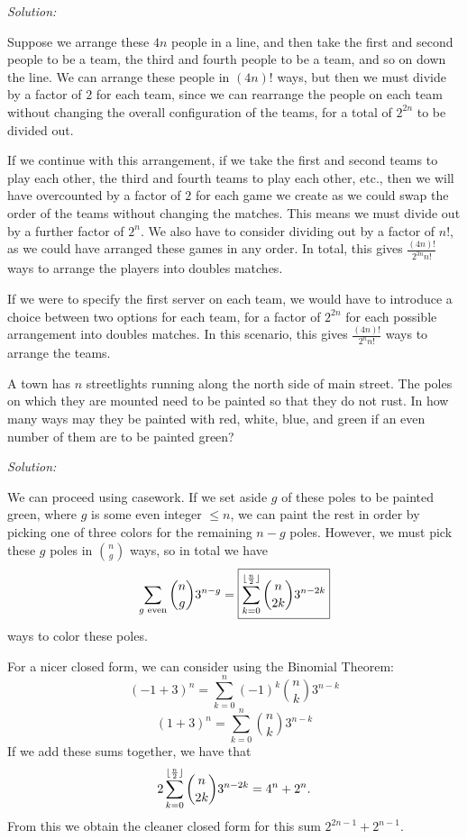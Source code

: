 \documentclass[12pt]{scrartcl}
\newenvironment{problem}[2][Problem]{\begin{trivlist}
\item[\hskip \labelsep {\bfseries #1}\hskip \labelsep {\bfseries #2.}]}{\end{trivlist}}
\newenvironment{solution}
    {\emph{Solution:}
    }
    {
    \qedhere
    }
\begin{document}
\begin{solution}
Suppose we arrange these $4n$ people in a line, and then take the first and second people to be a team, the third and fourth people to be a team, and so on down the line. We can arrange these people in $(4n)!$ ways, but then we must divide by a factor of $2$ for each team, since we can rearrange the people on each team without changing the overall configuration of the teams, for a total of $2^{2n}$ to be divided out. 

If we continue with this arrangement, if we take the first and second teams to play each other, the third and fourth teams to play each other, etc., then we will have overcounted by a factor of $2$ for each game we create as we could swap the order of the teams without changing the matches. This means we must divide out by a further factor of $2^n$. We also have to consider dividing out by a factor of $n!$, as we could have arranged these games in any order. In total, this gives $\boxed{\tfrac{(4n)!}{2^{3n} n!}}$ ways to arrange the players into doubles matches.

If we were to specify the first server on each team, we would have to introduce a choice between two options for each team, for a factor of $2^{2n}$ for each possible arrangement into doubles matches. In this scenario, this gives $\boxed{\tfrac{(4n)!}{2^{n} n!}}$ ways to arrange the teams.  
\end{solution}

% 

\begin{problem}{6}
A town has $n$ streetlights running along the north side of main street. The poles on which they are mounted need to be painted so that they do not rust. In how many ways may they be painted with red, white, blue, and green if an even number of them are to be painted green?
\end{problem}

\begin{solution}
We can proceed using casework. If we set aside $g$ of these poles to be painted green, where $g$ is some even integer $\leq n$, we can paint the rest in order by picking one of three colors for the remaining $n-g$ poles. However, we must pick these $g$ poles in $\binom{n}{g}$ ways, so in total we have
\[
\sum_{g \text{ even}} \binom{n}{g} 3^{n-g} = \boxed{\sum_{k=0}^{\lfloor\frac{n}{2}\rfloor} \binom{n}{2k} 3^{n-2k}}
\]
ways to color these poles. 

For a nicer closed form, we can consider using the Binomial Theorem: 
\[
	(-1+3)^n = \sum_{k=0}^n (-1)^k \binom{n}{k} 3^{n-k} 
\]
\[
	(1+3)^n = \sum_{k=0}^n \binom{n}{k} 3^{n-k} 
\]
If we add these sums together, we have that 
\[
	2 \sum_{k=0}^{\lfloor\frac{n}{2}\rfloor} \binom{n}{2k} 3^{n-2k} = 4^n + 2^n.
\]
From this we obtain the cleaner closed form for this sum $\boxed{2^{2n-1} + 2^{n-1}}$. 
\end{solution}
\end{document}
